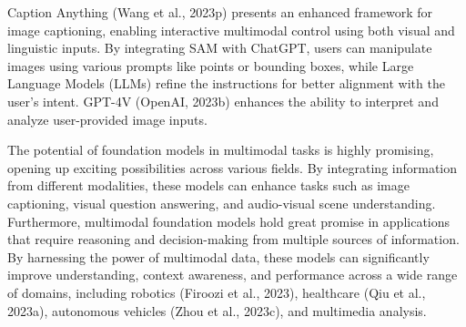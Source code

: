 Caption Anything (Wang et al., 2023p) presents an enhanced framework for image captioning, enabling interactive multimodal control using both visual and linguistic inputs. By integrating SAM with ChatGPT, users can manipulate images using various prompts like points or bounding boxes, while Large Language Models (LLMs) refine the instructions for better alignment with the user's intent. GPT-4V (OpenAI, 2023b) enhances the ability to interpret and analyze user-provided image inputs.

The potential of foundation models in multimodal tasks is highly promising, opening up exciting possibilities across various fields. By integrating information from different modalities, these models can enhance tasks such as image captioning, visual question answering, and audio-visual scene understanding. Furthermore, multimodal foundation models hold great promise in applications that require reasoning and decision-making from multiple sources of information. By harnessing the power of multimodal data, these models can significantly improve understanding, context awareness, and performance across a wide range of domains, including robotics (Firoozi et al., 2023), healthcare (Qiu et al., 2023a), autonomous vehicles (Zhou et al., 2023c), and multimedia analysis.